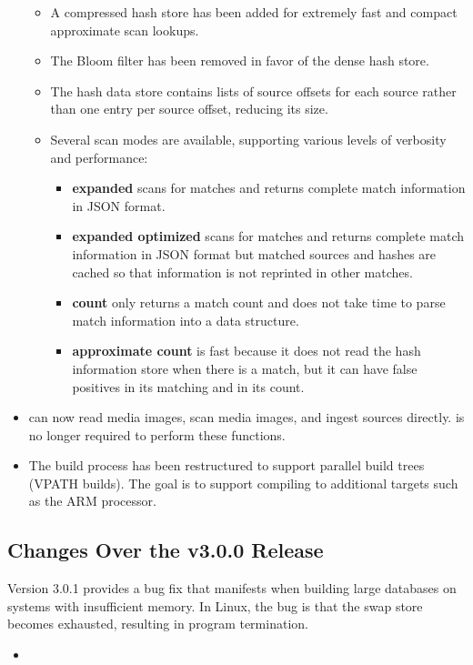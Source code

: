 \documentclass[11pt,fleqn]{article} %
\begin{document}
\begin{itemize}
\begin{itemize}
  \item A compressed hash store has been added for extremely fast and compact approximate scan lookups.
  \item The Bloom filter has been removed in favor of the dense hash store.
  \item The hash data store contains lists of source offsets for each source rather than one entry per source offset, reducing its size.
  \item Several scan modes are available, supporting various levels of verbosity and performance:
    \begin{itemize}
    \item \textbf{expanded} scans for matches and returns complete match information in JSON format.
    \item \textbf{expanded optimized} scans for matches and returns complete match information in JSON format but matched sources and hashes are cached so that information is not reprinted in other matches.
    \item \textbf{count} only returns a match count and does not take time to parse match information into a data structure.
    \item \textbf{approximate count} is fast because it does not read the hash information store when there is a match, but it can have false positives in its matching and in its count.
    \end{itemize}
  \end{itemize}
\item \hdb can now read media images, scan media images, and ingest sources directly.  \bulk is no longer required to perform these functions.
\item The build process has been restructured to support parallel build trees (VPATH builds).  The goal is to support compiling to additional targets such as the ARM processor.
\end{itemize}

\subsection{Changes Over the \hdb v3.0.0 Release}
\hdb Version 3.0.1 provides a bug fix that manifests when building large databases on systems with insufficient memory. In Linux, the bug is that the swap store becomes exhausted, resulting in program termination.
\begin{itemize}
\item 
\end{itemize}
\end{document}
